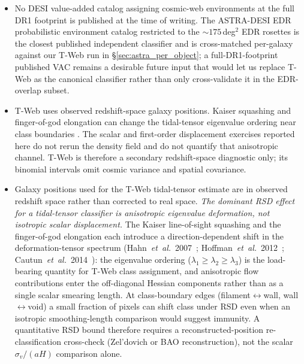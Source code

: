 \documentclass[aps,prd,twocolumn,superscriptaddress,showpacs,preprintnumbers,nofootinbib,longbibliography,floatfix]{revtex4-2}
\begin{document}
\begin{itemize}
\item No DESI value-added catalog assigning cosmic-web environments
at the full DR1 footprint is published at the time of writing.
The ASTRA-DESI EDR probabilistic environment catalog
\cite{ASTRADESI2026} restricted to the $\sim\!175$\,deg$^2$ EDR
rosettes is the closest published independent classifier and is
cross-matched per-galaxy against our T-Web run in
\S\ref{sec:astra_per_object}; a full-DR1-footprint published VAC
remains a desirable future input that would let us replace T-Web as
the canonical classifier rather than only cross-validate it in
the EDR-overlap subset.
\item T-Web uses observed redshift-space galaxy positions. Kaiser
squashing and finger-of-god elongation can change the tidal-tensor
eigenvalue ordering near class boundaries
\cite{Hahn2007,Hoffman2012,Cautun2014}. The scalar and first-order
displacement exercises reported here do not rerun the density field and
do not quantify that anisotropic channel. T-Web is therefore a secondary
redshift-space diagnostic only; its binomial intervals omit cosmic
variance and spatial covariance.
\iffalse
\item Galaxy positions used for the T-Web tidal-tensor estimate are
in observed redshift space rather than corrected to real space.
\emph{The dominant RSD effect for a tidal-tensor classifier is
anisotropic eigenvalue deformation, not isotropic scalar displacement.}
The Kaiser
line-of-sight squashing and the finger-of-god elongation each
introduce a direction-dependent shift in the deformation-tensor
spectrum
(Hahn~\textit{et~al.}~2007~\cite{Hahn2007};
Hoffman~\textit{et~al.}~2012~\cite{Hoffman2012};
Cautun~\textit{et~al.}~2014~\cite{Cautun2014}): the eigenvalue
ordering ($\lambda_1 \ge \lambda_2 \ge \lambda_3$) is the
load-bearing quantity for T-Web class assignment, and anisotropic
flow contributions enter the off-diagonal Hessian components rather
than as a single scalar smearing length. At class-boundary edges
(filament$\leftrightarrow$wall, wall$\leftrightarrow$void) a small
fraction of pixels can shift class under RSD even when an isotropic
smoothing-length comparison would suggest immunity. A quantitative
RSD bound therefore requires a reconstructed-position re-classification
cross-check (Zel'dovich or BAO reconstruction), not the scalar
$\sigma_v/(aH)$ comparison alone.


\end{itemize}
\end{document}
